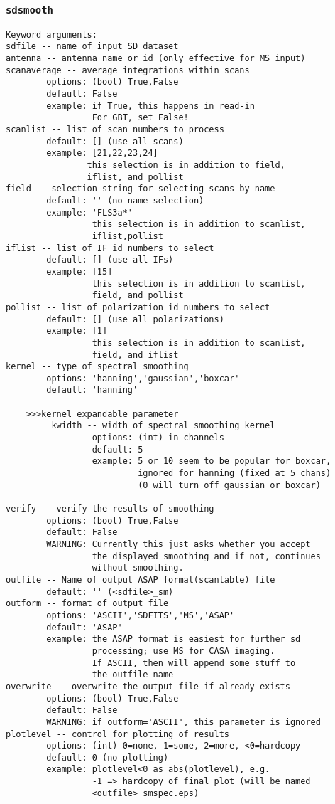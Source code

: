 \subsubsection{{\tt sdsmooth}}
\label{section:sd.sdtasks.tasks.sdsmooth}

\begin{verbatim}
Keyword arguments:
sdfile -- name of input SD dataset
antenna -- antenna name or id (only effective for MS input)
scanaverage -- average integrations within scans
        options: (bool) True,False
        default: False
        example: if True, this happens in read-in
                 For GBT, set False!
scanlist -- list of scan numbers to process
        default: [] (use all scans)
        example: [21,22,23,24]
                this selection is in addition to field,
                iflist, and pollist
field -- selection string for selecting scans by name
        default: '' (no name selection)
        example: 'FLS3a*'
                 this selection is in addition to scanlist,
                 iflist,pollist
iflist -- list of IF id numbers to select
        default: [] (use all IFs)
        example: [15]
                 this selection is in addition to scanlist,
                 field, and pollist
pollist -- list of polarization id numbers to select
        default: [] (use all polarizations)
        example: [1]
                 this selection is in addition to scanlist,
                 field, and iflist
kernel -- type of spectral smoothing
        options: 'hanning','gaussian','boxcar'
        default: 'hanning'
        
    >>>kernel expandable parameter
         kwidth -- width of spectral smoothing kernel
                 options: (int) in channels
                 default: 5
                 example: 5 or 10 seem to be popular for boxcar,
                          ignored for hanning (fixed at 5 chans)
                          (0 will turn off gaussian or boxcar)
                          
verify -- verify the results of smoothing
        options: (bool) True,False
        default: False
        WARNING: Currently this just asks whether you accept
                 the displayed smoothing and if not, continues
                 without smoothing.
outfile -- Name of output ASAP format(scantable) file
        default: '' (<sdfile>_sm)
outform -- format of output file
        options: 'ASCII','SDFITS','MS','ASAP'
        default: 'ASAP'
        example: the ASAP format is easiest for further sd
                 processing; use MS for CASA imaging.
                 If ASCII, then will append some stuff to
                 the outfile name
overwrite -- overwrite the output file if already exists
        options: (bool) True,False
        default: False
        WARNING: if outform='ASCII', this parameter is ignored
plotlevel -- control for plotting of results
        options: (int) 0=none, 1=some, 2=more, <0=hardcopy
        default: 0 (no plotting)
        example: plotlevel<0 as abs(plotlevel), e.g.
                 -1 => hardcopy of final plot (will be named
                 <outfile>_smspec.eps)
\end{verbatim}

